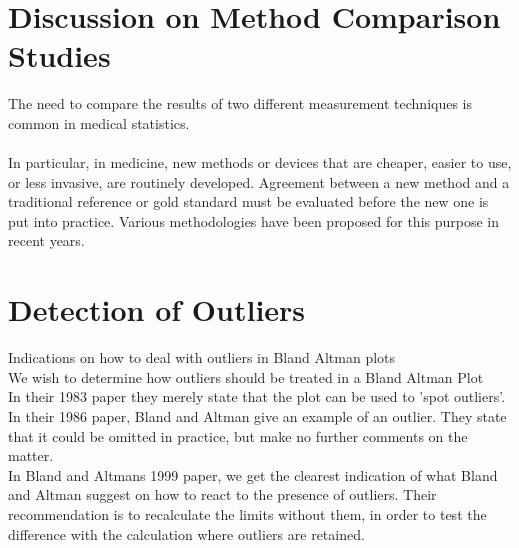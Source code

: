 \documentclass[12pt, a4paper]{report}
\theoremstyle{plain}
\theoremstyle{definition}
\theoremstyle{remark}
\begin{document}
	


	
	
	

	\section{Discussion on Method Comparison Studies}
	
	The need to compare the results of two different measurement
	techniques is common in medical statistics.
	\\
	\\
	In particular, in medicine, new methods or devices that are
	cheaper, easier to use, or less invasive, are routinely developed.
	Agreement between a new method and a traditional reference or gold
	standard must be evaluated before the new one is put into
	practice. Various methodologies have been proposed for this
	purpose in recent years.
	
	\section{Detection of Outliers}
	Indications on how to deal with outliers in Bland Altman plots
	\\
	We wish to determine how outliers should be treated in a Bland
	Altman Plot
	\\
	In their 1983 paper they merely state that the plot can be used to
	'spot outliers'.
	\\
	In  their 1986 paper, Bland and Altman give an example of an
	outlier. They state that it could be omitted in practice, but make
	no further comments on the matter.
	\\
	In Bland and Altmans 1999 paper, we get the clearest indication of
	what Bland and Altman suggest on how to react to the presence of
	outliers. Their recommendation is to recalculate the limits
	without them, in order to test the difference with the calculation
	where outliers are retained.\\
	
\end{document}
